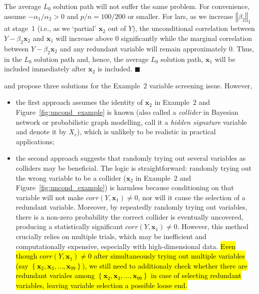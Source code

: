 \documentclass[11pt,review,authoryear]{elsarticle}
\begin{document}
The average $L_0$ solution path will not suffer the same problem. For convenience, assume $-\alpha_1 / \alpha_2 > 0$ and $p/n = 100/200$ or smaller. For lars, as we increase $\left\Vert \beta_2 \right\Vert_1$ at stage~1 (i.e., as we `partial' $\mathbf{x}_2$ out of $Y$), the unconditional correlation between $Y - \beta_2 \mathbf{x}_2$ and $\mathbf{x}_1$ will increase above $0$ significantly while the marginal correlation between $Y - \beta_2 \mathbf{x}_2$ and any redundant variable will remain approximately $0$. Thus, in the $L_0$ solution path and, hence, the average $L_0$ solution path, $\mathbf{x}_1$ will be included immediately after $\mathbf{x}_2$ is included. $\blacksquare$

\citet{fan2008sure} and \citet{barut2016conditional} propose three solutions for the Example~2 variable screening issue. However,

\begin{itemize}
  \item the first approach \citep[Section~2.2 and~3]{barut2016conditional} assumes the identity of $\mathbf{x}_2$ in Example~2 and Figure~\ref{fig:uncond_example} is known (also called a \emph{collider} in Bayesian network or probabilistic graph modelling, \citet{barut2016conditional} call it a \emph{hidden signature} variable and denote it by $X_c$), which is unlikely to be realistic in practical applications;
  \item the second approach \citep[Section~1 and~2.2]{barut2016conditional} suggests that randomly trying out several variables as colliders may be beneficial. The logic is straightforward: randomly trying out the wrong variable to be a collider ($\mathbf{x}_2$ in Example~2 and Figure~\ref{fig:uncond_example}) is harmless because conditioning on that variable will not make $corr(Y,\mathbf{x}_1) \neq 0$, nor will it cause the selection of a redundant variable. Moreover, by repeatedly randomly trying out variables, there is a non-zero probability the correct collider is eventually uncovered, producing a statistically significant $corr(Y,\mathbf{x}_1) \neq 0$. However, this method crucially relies on multiple trials, which may be inefficient and computationally expensive, especially with high-dimensional data. \hl{Even though $corr(Y, \mathbf{x}_1) \neq 0$ after simultaneously trying out multiple variables (say $\left\{\mathbf{x}_2, \mathbf{x}_3, \ldots, \mathbf{x}_{99} \right\}$), we still need to additionaly check whether there are redundant variales among $\left\{\mathbf{x}_2, \mathbf{x}_3, \ldots, \mathbf{x}_{99} \right\}$ in case of selecting redundant variables, leaving variable selection a possible loose end.}
\end{itemize}
\end{document}
